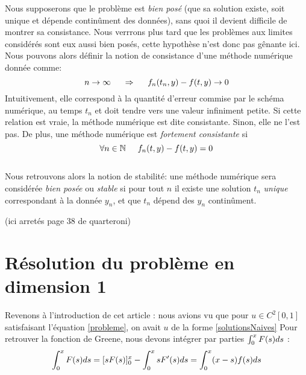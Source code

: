 \documentclass[12pt]{article}
\newcommand{\N}{\mathbb N}
\newcommand{\espace}{\hspace{5mm}}
\begin{document}
Nous supposerons que le problème est \emph{bien posé} (que sa solution existe, soit unique et dépende continûment des données), sans quoi il devient difficile de montrer sa consistance. Nous verrrons plus tard que les problèmes aux limites considérés sont eux aussi bien posés, cette hypothèse n'est donc pas gênante ici.\\
\quad Nous pouvons alors définir la notion de consistance d'une méthode numérique donnée comme:
\begin{equation} \label{defConsistance}
n \rightarrow \infty \espace \Rightarrow \espace f_n(t_n, y) - f(t,y) \rightarrow 0
\end{equation}
Intuitivement, elle correspond à la quantité d'erreur commise par le schéma numérique, au temps $t_n$ et doit tendre vers une valeur infiniment petite.
Si cette relation est vraie, la méthode numérique est dite consistante. Sinon, elle ne l'est pas. De plus, une méthode numérique est \emph{fortement consistante} si
\begin{equation}
\forall n \in \N \espace  f_n(t, y) - f(t,y) = 0
\end{equation}
\\
\quad Nous retrouvons alors la notion de stabilité: une méthode numérique sera considérée \emph{bien posée} ou \emph {stable} si pour tout $n$ il existe une solution $t_n$ \emph{unique} correspondant à la donnée $y_n$, et que $t_n$ dépend des $y_n$ continûment.


(ici arretés page 38 de quarteroni)



\section{Résolution du problème en dimension 1}

\quad Revenons à l'introduction de cet article : nous avions vu que pour $u \in C^2 [0, 1]$ satisfaisant l'équation \eqref{probleme}, on avait $u$ de la forme \eqref{solutionsNaives}  Pour retrouver la fonction de Greene, nous devons intégrer par parties $\int_0^x F\relax(s) ds$ : 
\begin{equation}
\int_0^x F\relax(s) ds = [sF\relax(s)]_0^x - \int_0^x sF'\relax(s) ds = \int_0^x(x-s)f\relax(s)ds
\end{equation}
\end{document}
